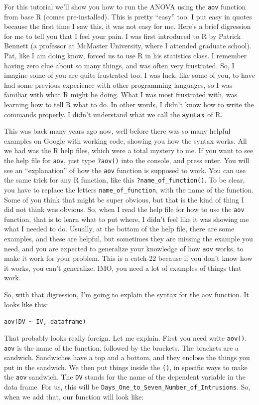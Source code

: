\documentclass[]{book}
\theoremstyle{definition}
\theoremstyle{definition}
\theoremstyle{definition}
\theoremstyle{remark}
\begin{document}
For this tutorial we'll show you how to run the ANOVA using the
\texttt{aov} function from base R (comes pre-installed). This is pretty
``easy'' too. I put easy in quotes because the first time I saw this, it
was not easy for me. Here's a brief digression for me to tell you that I
feel your pain. I was first introduced to R by Patrick Bennett (a
professor at McMaster University, where I attended graduate school).
Pat, like I am doing know, forced us to use R in his statistics class. I
remember having zero clue about so many things, and was often very
frustrated. So, I imagine some of you are quite frustrated too. I was
luck, like some of you, to have had some previous experience with other
programming languages, so I was familiar with what R might be doing.
What I was most frustrated with, was learning how to tell R what to do.
In other words, I didn't know how to write the commands properly. I
didn't understand what we call the \textbf{syntax} of R.

This was back many years ago now, well before there was so many helpful
examples on Google with working code, showing you how the syntax works.
All we had was the R help files, which were a total mystery to me. If
you want to see the help file for \texttt{aov}, just type
\texttt{?aov()} into the console, and press enter. You will see an
``explanation'' of how the \texttt{aov} function is supposed to work.
You can use the same trick for any R function, like this
\texttt{?name\_of\_function()}. To be clear, you have to replace the
letters \texttt{name\_of\_function}, with the name of the function. Some
of you think that might be super obvious, but that is the kind of thing
I did not think was obvious. So, when I read the help file for how to
use the \texttt{aov} function, that is to learn what to put where, I
didn't feel like it was showing me what I needed to do. Usually, at the
bottom of the help file, there are some examples, and these are helpful,
but sometimes they are missing the example you need, and you are
expected to generalize your knowledge of how \texttt{aov} works, to make
it work for your problem. This is a catch-22 because if you don't know
how it works, you can't generalize. IMO, you need a lot of examples of
things that work.

So, with that digression, I'm going to explain the syntax for the aov
function. It looks like this:

\texttt{aov(DV\ \textasciitilde{}\ IV,\ dataframe)}

That probably looks really foreign. Let me explain. First you need write
\texttt{aov()}. \texttt{aov} is the name of the function, followed by
the brackets. The brackets are a sandwich. Sandwiches have a top and a
bottom, and they enclose the things you put in the sandwich. We then put
things inside the \texttt{()}, in specific ways to make the \texttt{aov}
sandwich. The \texttt{DV} stands for the name of the dependent variable
in the data frame. For us, this will be
\texttt{Days\_One\_to\_Seven\_Number\_of\_Intrusions}. So, when we add
that, our function will look like:
\end{document}
